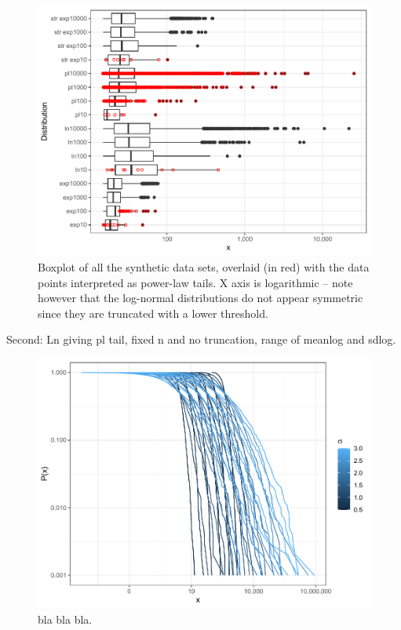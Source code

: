 \documentclass[
  12pt,
]{book}
\begin{document}
\begin{figure}

{\centering \includegraphics[width=0.7\linewidth]{bookdown-demo_files/figure-latex/05-pltails-1} 

}

\caption{Boxplot of all the synthetic data sets, overlaid (in red) with the data points interpreted as power-law tails. X axis is logarithmic -- note however that the log-normal distributions do not appear symmetric since they are truncated with a lower threshold.}\label{fig:05-pltails}
\end{figure}

\FloatBarrier

Second: Ln giving pl tail, fixed n and no truncation, range of meanlog and sdlog.



\begin{figure}

{\centering \includegraphics[width=0.7\linewidth]{bookdown-demo_files/figure-latex/05-synth-ln-1} 

}

\caption{bla bla bla.}\label{fig:05-synth-ln}
\end{figure}
\end{document}
